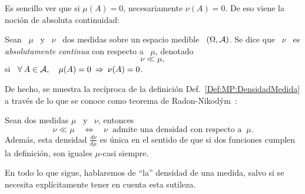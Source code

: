 Es sencillo ver que  si $\mu(A) = 0$, necesariamente $\nu(A) =  0$. De eso viene
la noci\'on de absoluta continuidad:
%
\begin{definicion}
\label{Def:MP:AbsolutaContinuidad}
%
  Sean  \  $\mu$  \  y  \  $\nu$  \ dos  medidas  sobre  un  espacio  medible  \
  $(\Omega,\mathcal{A})$.   Se dice que  \ $\nu$  \ es  {\it absolutamente  continua} con
  respecto a \ $\mu$, denotado \[\nu \ll \mu,\] si \ $\forall \: A \in \mathcal{A}, \quad
  \mu(A) = 0 \: \Rightarrow \: \nu(A) = 0$.
\end{definicion}
%
De    hecho,     se    muestra    la    rec\'iproca     de    la    definici\'on
Def.~\ref{Def:MP:DensidadMedida} a trav\'es de lo  que se conoce como teorema de
Radon-Nikod\'ym~\cite{Nik30, AthLah06, Bog07:v1, Coh13}:
%
\begin{teorema}
\label{Teo:MP:RadonNikodym}
%
  Sean dos medidas $\mu$ \ y \ $\nu$, entonces
  \[
  \nu \ll \mu \quad \Longleftrightarrow  \quad \nu \: \mbox{ admite una densidad
    con respecto a } \: \mu.
  \]
  Adem\'as, esta densidad $\frac{d\nu}{d\mu}$ es \'unica en el sentido de que si
  dos funciones cumplen la definici\'on, son iguales $\mu$-casi siempre.
\end{teorema}

En todo lo que  sigue, hablaremos de ``la'' densidad de una  medida, salvo si se
necesita expl\'icitamente tener en cuenta esta sutileza.

